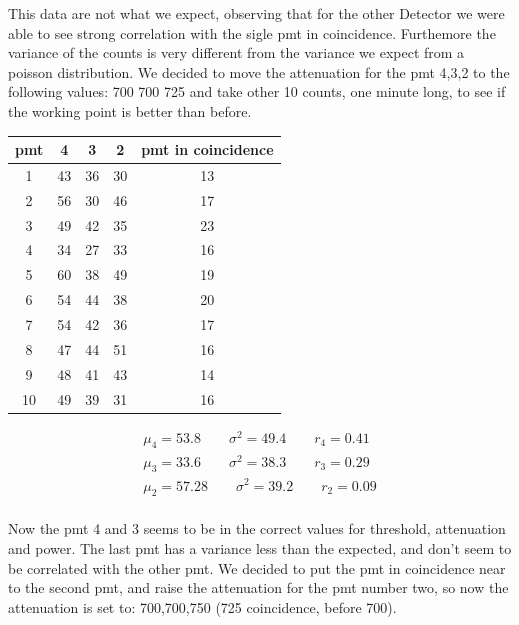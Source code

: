 \documentclass[10pt,a4paper]{article}
\begin{document}
This data are not what we expect, observing that for the other Detector we were able to see strong correlation with the sigle pmt in coincidence. Furthemore the variance of the counts is very different from the variance we expect from a poisson distribution. We decided to move the attenuation for the pmt 4,3,2 to the following values: 700 700 725 and take other 10 counts, one minute long, to see if the working point is better than before.


\begin{center}
\begin{tabular}{|c|c|c|c|c|}
\hline 
pmt & 4 & 3 & 2 & pmt in coincidence \\ 
\hline 
1 & 43  & 36 & 30 & 13 \\ 
\hline 
2 & 56 & 30 & 46 & 17 \\ 
\hline 
3 & 49 & 42 & 35 & 23 \\ 
\hline 
4 & 34 & 27 & 33 & 16 \\ 
\hline 
5 & 60 & 38 & 49 & 19 \\ 
\hline 
6 & 54 & 44 & 38 & 20 \\ 
\hline 
7 & 54 & 42 & 36 & 17 \\ 
\hline 
8 & 47 & 44 & 51 & 16 \\ 
\hline 
9 & 48 & 41 & 43 & 14 \\ 
\hline 
10 & 49 & 39 & 31 & 16 \\ 
\hline 
\end{tabular} 
\end{center}

\begin{equation*}
\begin{split}
\mu_{4} = 53.8 \qquad \sigma^{2} = 49.4 \qquad  r_{4} = 0.41 \\
\mu_{3} = 33.6 \qquad \sigma^{2} = 38.3 \qquad r_{3} = 0.29 \\
\mu_{2} = 57.28  \qquad \sigma^{2} = 39.2 \qquad r_{2} = 0.09 \\
\end{split}
\end{equation*}

Now the pmt 4 and 3 seems to be in the correct values for threshold, attenuation and power. The last pmt has a variance less than the expected, and don't seem to be correlated with the other pmt. We decided to put the pmt in coincidence near to the second pmt, and raise the attenuation for the pmt number two, so now the attenuation is set to: 700,700,750 (725 coincidence, before 700).
\end{document}
